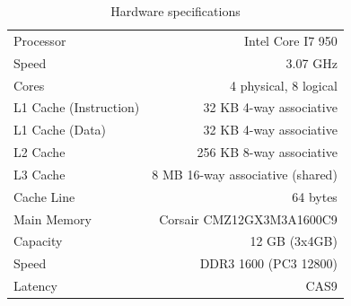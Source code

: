 \begin{table}[ht]
\begin{tabular}{ l r }
\hline
Processor & Intel Core I7 950 \\
Speed & 3.07 GHz \\
Cores & 4 physical, 8 logical\\
L1 Cache (Instruction) & 32 KB 4-way associative \\
L1 Cache (Data) & 32 KB 4-way associative \\
L2 Cache & 256 KB 8-way associative \\
L3 Cache & 8 MB 16-way associative (shared) \\
Cache Line & 64 bytes \\
\hline
Main Memory & Corsair CMZ12GX3M3A1600C9 \\
Capacity & 12 GB (3x4GB) \\
Speed & DDR3 1600 (PC3 12800) \\
Latency & CAS9 \\
\hline
\end{tabular}
\caption{Hardware specifications}
\label{HardwareTable}
\end{table}


